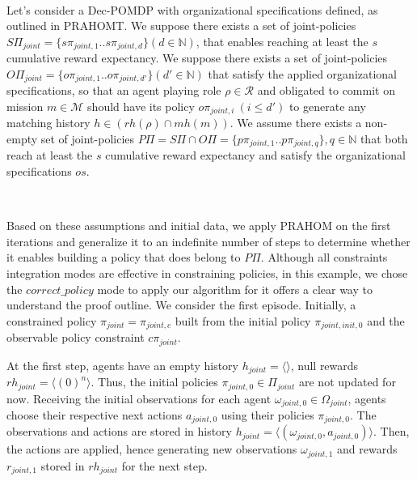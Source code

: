 \begin{proofoutline}
    \

    \noindent Let's consider a Dec-POMDP with organizational specifications defined, as outlined in PRAHOMT. We suppose there exists a set of joint-policies $S\Pi_{joint} = \{s\pi_{joint,1}.. s\pi_{joint,d}\} \allowbreak (d \in \mathbb{N})$, that enables reaching at least the $s$ cumulative reward expectancy.
    \noindent We suppose there exists a set of joint-policies $O\Pi_{joint} = \{o\pi_{joint,1}.. o\pi_{joint,d'}\} (d' \in \mathbb{N})$ that satisfy the applied organizational specifications, so that an agent playing role $\rho \in \mathcal{R}$ and obligated to commit on mission $m \in \mathcal{M}$ should have its policy $o\pi_{joint,i} \ (i \leq d')$ to generate any matching history $h \in (rh(\rho) \cap mh(m))$.
    \noindent We assume there exists a non-empty set of joint-policies $P\Pi = S\Pi \cap O\Pi \allowbreak = \{p\pi_{joint,1}..p\pi_{joint,q}\}, q \in \mathbb{N}$ that both reach at least the $s$ cumulative reward expectancy and satisfy the organizational specifications $os$.

    \

    \noindent Based on these assumptions and initial data, we apply PRAHOM on the first iterations and generalize it to an indefinite number of steps to determine whether it enables building a policy that does belong to $P\Pi$. Although all constraints integration modes are effective in constraining policies, in this example, we chose the $correct\_policy$ mode to apply our algorithm for it offers a clear way to understand the proof outline.
    We consider the first episode. Initially, a constrained policy $\pi_{joint} = \pi_{joint,c}$ built from the initial policy $\pi_{joint,init,0}$ and the observable policy constraint $c\pi_{joint}$.

    At the first step, agents have an empty history $h_{joint} = \langle \rangle$, null rewards $rh_{joint} = \langle (0)^n \rangle $. Thus, the initial policies $\pi_{joint,0} \in \Pi_{joint}$ are not updated for now. Receiving the initial observations for each agent $\omega_{joint,0} \in \Omega_{joint}$, agents choose their respective next actions $a_{joint,0}$ using their policies $\allowbreak \pi_{joint,0}$. The observations and actions are stored in history $h_{joint} \allowbreak = \allowbreak \langle \allowbreak (\omega_{joint,0}, \allowbreak a_{joint,0}) \rangle$. Then, the actions are applied, hence generating new observations $\omega_{joint,1}$ and rewards $r_{joint,1}$ stored in $rh_{joint}$ for the next step.


\end{proofoutline}
